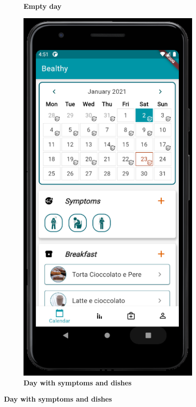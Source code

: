 \documentclass [12pt]{article}
\begin{document}
\begin{description}[leftmargin=1cm,rightmargin=1cm]
\begin{figure}[h!]
\begin{subfigure}[tl]{0.3\linewidth}
\caption{\textbf{Empty day}}
\end{subfigure}\hfill
\begin{subfigure}[tr]{0.3\linewidth}
\includegraphics[width=\linewidth]{HomePage2.PNG}
\caption{\textbf{Day with symptoms and dishes}}
\end{subfigure}
\hspace*{\fill}
\end{figure}


\end{description}
\end{document}
